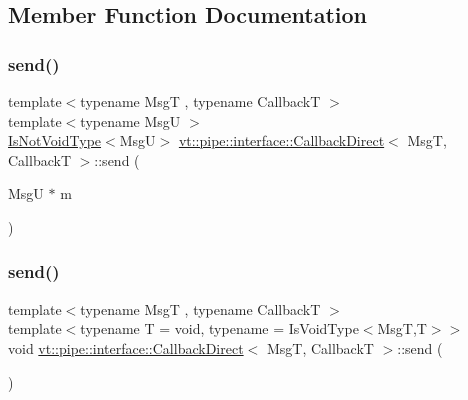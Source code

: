 \subsection{Member Function Documentation}
\mbox{\label{structvt_1_1pipe_1_1interface_1_1_callback_direct_a7379f2e63c757627089825c23e10475e}} 
\subsubsection{\texorpdfstring{send()}{send()}\hspace{0.1cm}{\footnotesize\ttfamily [1/2]}}
{\footnotesize\ttfamily template$<$typename MsgT , typename CallbackT $>$ \\
template$<$typename MsgU $>$ \\
\hyperlink{structvt_1_1pipe_1_1interface_1_1_callback_direct_a619c2c4c96ec2573b87b992344c48826}{Is\+Not\+Void\+Type}$<$MsgU$>$ \hyperlink{structvt_1_1pipe_1_1interface_1_1_callback_direct}{vt\+::pipe\+::interface\+::\+Callback\+Direct}$<$ MsgT, CallbackT $>$\+::send (\begin{DoxyParamCaption}\item[{MsgU $\ast$}]{m }\end{DoxyParamCaption})\hspace{0.3cm}{\ttfamily [inline]}}

\mbox{\label{structvt_1_1pipe_1_1interface_1_1_callback_direct_a2bda5c90901cc0acc3c406c968f9b43b}} 
\subsubsection{\texorpdfstring{send()}{send()}\hspace{0.1cm}{\footnotesize\ttfamily [2/2]}}
{\footnotesize\ttfamily template$<$typename MsgT , typename CallbackT $>$ \\
template$<$typename T  = void, typename  = Is\+Void\+Type$<$\+Msg\+T,\+T$>$$>$ \\
void \hyperlink{structvt_1_1pipe_1_1interface_1_1_callback_direct}{vt\+::pipe\+::interface\+::\+Callback\+Direct}$<$ MsgT, CallbackT $>$\+::send (\begin{DoxyParamCaption}{ }\end{DoxyParamCaption})\hspace{0.3cm}{\ttfamily [inline]}}


